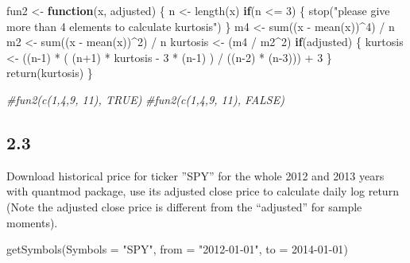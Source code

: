 \documentclass[
]{article}
\newenvironment{Shaded}{\begin{snugshade}}{\end{snugshade}}
\newcommand{\AttributeTok}[1]{\textcolor[rgb]{0.77,0.63,0.00}{#1}}
\newcommand{\CommentTok}[1]{\textcolor[rgb]{0.56,0.35,0.01}{\textit{#1}}}
\newcommand{\ControlFlowTok}[1]{\textcolor[rgb]{0.13,0.29,0.53}{\textbf{#1}}}
\newcommand{\DecValTok}[1]{\textcolor[rgb]{0.00,0.00,0.81}{#1}}
\newcommand{\FunctionTok}[1]{\textcolor[rgb]{0.00,0.00,0.00}{#1}}
\newcommand{\NormalTok}[1]{#1}
\newcommand{\OtherTok}[1]{\textcolor[rgb]{0.56,0.35,0.01}{#1}}
\newcommand{\SpecialCharTok}[1]{\textcolor[rgb]{0.00,0.00,0.00}{#1}}
\newcommand{\StringTok}[1]{\textcolor[rgb]{0.31,0.60,0.02}{#1}}
\begin{document}
\begin{Shaded}
\begin{Highlighting}[]
\NormalTok{fun2 }\OtherTok{\textless{}{-}} \ControlFlowTok{function}\NormalTok{(x, adjusted) \{}
\NormalTok{  n }\OtherTok{\textless{}{-}} \FunctionTok{length}\NormalTok{(x)}
  \ControlFlowTok{if}\NormalTok{(n }\SpecialCharTok{\textless{}=} \DecValTok{3}\NormalTok{) \{}
    \FunctionTok{stop}\NormalTok{(}\StringTok{"please give more than 4 elements to calculate kurtosis"}\NormalTok{)}
\NormalTok{  \}}
\NormalTok{  m4 }\OtherTok{\textless{}{-}} \FunctionTok{sum}\NormalTok{((x }\SpecialCharTok{{-}} \FunctionTok{mean}\NormalTok{(x))}\SpecialCharTok{\^{}}\DecValTok{4}\NormalTok{) }\SpecialCharTok{/}\NormalTok{ n}
\NormalTok{  m2 }\OtherTok{\textless{}{-}} \FunctionTok{sum}\NormalTok{((x }\SpecialCharTok{{-}} \FunctionTok{mean}\NormalTok{(x))}\SpecialCharTok{\^{}}\DecValTok{2}\NormalTok{) }\SpecialCharTok{/}\NormalTok{ n}
\NormalTok{  kurtosis }\OtherTok{\textless{}{-}}\NormalTok{ (m4 }\SpecialCharTok{/}\NormalTok{ m2}\SpecialCharTok{\^{}}\DecValTok{2}\NormalTok{)}
  \ControlFlowTok{if}\NormalTok{(adjusted) \{}
\NormalTok{    kurtosis }\OtherTok{\textless{}{-}}\NormalTok{ ((n}\DecValTok{{-}1}\NormalTok{)  }\SpecialCharTok{*}\NormalTok{ ( (n}\SpecialCharTok{+}\DecValTok{1}\NormalTok{) }\SpecialCharTok{*}\NormalTok{ kurtosis }\SpecialCharTok{{-}} \DecValTok{3} \SpecialCharTok{*}\NormalTok{ (n}\DecValTok{{-}1}\NormalTok{) ) }\SpecialCharTok{/}\NormalTok{ ((n}\DecValTok{{-}2}\NormalTok{) }\SpecialCharTok{*}\NormalTok{ (n}\DecValTok{{-}3}\NormalTok{))) }\SpecialCharTok{+} \DecValTok{3}
\NormalTok{  \}}
  \FunctionTok{return}\NormalTok{(kurtosis)}
\NormalTok{\}}

\CommentTok{\#fun2(c(1,4,9, 11), TRUE)}
\CommentTok{\#fun2(c(1,4,9, 11), FALSE)}
\end{Highlighting}
\end{Shaded}

\hypertarget{section-9}{%
\subsection{2.3}\label{section-9}}

Download historical price for ticker ''SPY'' for the whole 2012 and 2013
years with quantmod package, use its adjusted close price to calculate
daily log return (Note the adjusted close price is different from the
``adjusted'' for sample moments).

\begin{Shaded}
\begin{Highlighting}[]
\FunctionTok{getSymbols}\NormalTok{(}\AttributeTok{Symbols =} \StringTok{"SPY"}\NormalTok{, }\AttributeTok{from =} \StringTok{"2012{-}01{-}01"}\NormalTok{, }\AttributeTok{to =} \StringTok{\textquotesingle{}2014{-}01{-}01\textquotesingle{}}\NormalTok{)}
\end{Highlighting}
\end{Shaded}
\end{document}
